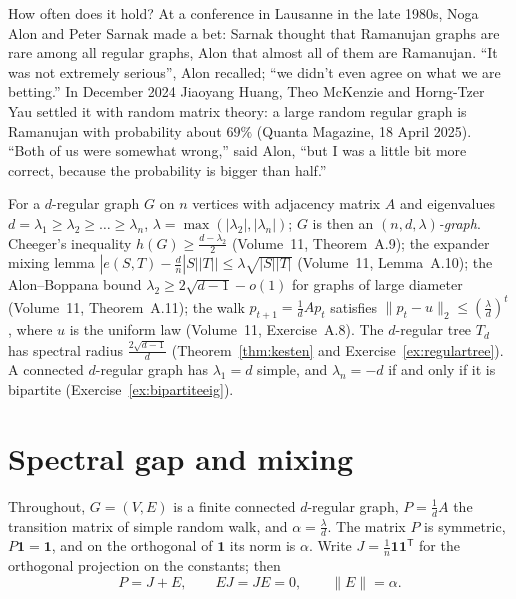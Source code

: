 How often does it hold? At a conference in Lausanne in the late 1980s, Noga Alon and Peter Sarnak made a bet: Sarnak thought that Ramanujan graphs are rare among all regular graphs, Alon that almost all
of them are Ramanujan. ``It was not extremely serious'', Alon recalled; ``we didn't even agree on what we are betting.'' In December 2024 Jiaoyang Huang, Theo McKenzie and Horng-Tzer Yau settled it with
random matrix theory: a large random regular graph is Ramanujan with probability about $69\%$ (Quanta Magazine, 18 April 2025). ``Both of us were somewhat wrong,'' said Alon, ``but I was a little bit more
correct, because the probability is bigger than half.''

\begin{reminder}
For a $d$-regular graph $G$ on $n$ vertices with adjacency matrix $A$ and eigenvalues $d=\lambda_1\ge\lambda_2\ge\dots\ge\lambda_n$, $\lambda=\max(|\lambda_2|,|\lambda_n|)$; $G$ is then an \emph{$(n,d,\lambda)$-graph}.
Cheeger's inequality $h(G)\ge\frac{d-\lambda_2}2$ (Volume~11, Theorem~A.9); the expander mixing lemma $|e(S,T)-\frac dn|S||T||\le\lambda\sqrt{|S||T|}$ (Volume~11, Lemma~A.10); the Alon--Boppana bound
$\lambda_2\ge2\sqrt{d-1}-o(1)$ for graphs of large diameter (Volume~11, Theorem~A.11); the walk $p_{t+1}=\frac1dAp_t$ satisfies $\|p_t-u\|_2\le(\frac\lambda d)^t$, where $u$ is the uniform law (Volume~11, Exercise~A.8).
The $d$-regular tree $T_d$ has spectral radius $\frac{2\sqrt{d-1}}d$ (Theorem~\ref{thm:kesten} and Exercise~\ref{ex:regulartree}). A connected $d$-regular graph has $\lambda_1=d$ simple, and $\lambda_n=-d$ if and only if it is bipartite
(Exercise~\ref{ex:bipartiteeig}).
\end{reminder}

\section{Spectral gap and mixing}

Throughout, $G=(V,E)$ is a finite connected $d$-regular graph, $P=\frac1dA$ the transition matrix of simple random walk, and $\alpha=\frac\lambda d$. The matrix $P$ is symmetric, $P\mathbf 1=\mathbf 1$, and on the orthogonal of
$\mathbf 1$ its norm is $\alpha$. Write $J=\frac1n\mathbf 1\mathbf 1^{\mathsf T}$ for the orthogonal projection on the constants; then
\begin{equation}\label{eq:pje}
P=J+E,\qquad EJ=JE=0,\qquad\|E\|=\alpha.
\end{equation}

